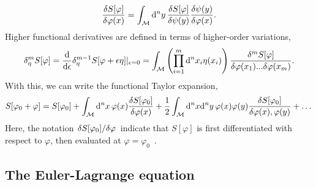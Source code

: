 %
\begin{equation}
    \fdv{S[\varphi]}{\varphi(x)}
    = \int_\Em \dd^n y \, 
    \fdv{S[\varphi]}{\psi(y)}
    \fdv{\psi(y)}{\varphi(x)}.
\end{equation}
%
Higher functional derivatives are defined in terms of higher-order variations,
%
\begin{equation}
    \delta^m_\eta S[\varphi]
    = \odv{}{\epsilon} \delta^{m-1}_\eta S[\varphi + \epsilon \eta]|_{\epsilon=0}
    = \int_\Em 
    \left(\prod_{i=1}^m \dd^n x_i \eta(x_i)\right) 
    \frac{\delta^m S[\varphi]}{\delta \varphi(x_1)...\delta\varphi(x_m)}.
\end{equation}
%
With this, we can write the functional Taylor expansion,
%
\begin{equation}
    S[\varphi_0 + \varphi]
    = S[\varphi_0]
    + \int_\Em \dd^n x \, \varphi(x) \fdv{S[\varphi_0]}{\varphi(x)}
    + \frac{1}{2} \int_\Em \dd^n x \dd^n y \, \varphi(x) \varphi(y) \fdv{S[\varphi_0]}{\varphi(x), \varphi(y)}
    +\dots
\end{equation}
%
Here, the notation $\fdv{S[\varphi_0]}/{\varphi}$ indicate that $S[\varphi]$ is first differentiated with respect to $\varphi$, then evaluated at $\varphi = \varphi_0$~\autocite{peskinIntroductionQuantumField1995}.


\subsection{The Euler-Lagrange equation}

